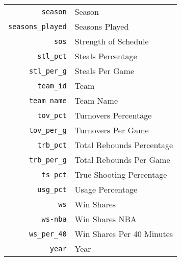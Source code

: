 \begin{table}[H]
\begin{tabular}{rl}
    \texttt{season}              & Season                                                        \\
    \texttt{seasons\_played}     & Seasons Played                                                \\
    \texttt{sos}                 & Strength of Schedule                                          \\
    \texttt{stl\_pct}            & Steals Percentage                                             \\
    \texttt{stl\_per\_g}         & Steals Per Game                                               \\
    \texttt{team\_id}            & Team                                                          \\
    \texttt{team\_name}          & Team Name                                                     \\
    \texttt{tov\_pct}            & Turnovers Percentage                                          \\
    \texttt{tov\_per\_g}         & Turnovers Per Game                                            \\
    \texttt{trb\_pct}            & Total Rebounds Percentage                                     \\
    \texttt{trb\_per\_g}         & Total Rebounds Per Game                                       \\
    \texttt{ts\_pct}             & True Shooting Percentage                                      \\
    \texttt{usg\_pct}            & Usage Percentage                                              \\
    \texttt{ws}                  & Win Shares                                                    \\
    \texttt{ws-nba}              & Win Shares NBA                                                \\
    \texttt{ws\_per\_40}         & Win Shares Per 40 Minutes                                     \\
    \texttt{year}                & Year                                                          \\
  \bottomrule
\end{tabular}
\end{table}
